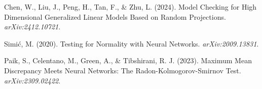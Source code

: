 \documentclass{article}
\begin{document}
{\begin{thebibliography}{99}
 Chen, W., Liu, J., Peng, H., Tan, F., \& Zhu, L. (2024). Model Checking for High Dimensional Generalized Linear Models Based on Random Projections. \emph{arXiv:2412.10721}.

 Simić, M. (2020). Testing for Normality with Neural Networks. \emph{arXiv:2009.13831}.

 Paik, S., Celentano, M., Green, A., \& Tibshirani, R. J. (2023). Maximum Mean Discrepancy Meets Neural Networks: The Radon-Kolmogorov-Smirnov Test. \emph{arXiv:2309.02422}.

\end{thebibliography}
}
\end{document}
